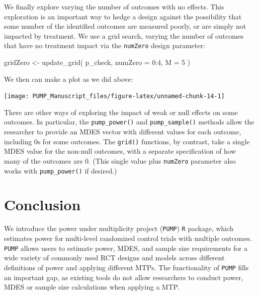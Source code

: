 \documentclass[
]{article}
\newenvironment{Shaded}{\begin{snugshade}}{\end{snugshade}}
\newcommand{\AttributeTok}[1]{\textcolor[rgb]{0.77,0.63,0.00}{#1}}
\newcommand{\DecValTok}[1]{\textcolor[rgb]{0.00,0.00,0.81}{#1}}
\newcommand{\FunctionTok}[1]{\textcolor[rgb]{0.00,0.00,0.00}{#1}}
\newcommand{\NormalTok}[1]{#1}
\newcommand{\OtherTok}[1]{\textcolor[rgb]{0.56,0.35,0.01}{#1}}
\newcommand{\SpecialCharTok}[1]{\textcolor[rgb]{0.00,0.00,0.00}{#1}}
\begin{document}
We finally explore varying the number of outcomes with no effects. This
exploration is an important way to hedge a design against the
possibility that some number of the identified outcomes are measured
poorly, or are simply not impacted by treatment. We use a grid search,
varying the number of outcomes that have no treatment impact via the
\texttt{numZero} design parameter:

\begin{Shaded}
\begin{Highlighting}[]
\NormalTok{gridZero }\OtherTok{\textless{}{-}} \FunctionTok{update\_grid}\NormalTok{( p\_check,}
            \AttributeTok{numZero =} \DecValTok{0}\SpecialCharTok{:}\DecValTok{4}\NormalTok{,}
            \AttributeTok{M =} \DecValTok{5}\NormalTok{ )}
\end{Highlighting}
\end{Shaded}

We then can make a plot as we did above:

\begin{center}\texttt{[image: PUMP\_Manuscript\_files/figure-latex/unnamed-chunk-14-1]} \end{center}

There are other ways of exploring the impact of weak or null effects on
some outcomes. In particular, the \texttt{pump\_power()} and
\texttt{pump\_sample()} methods allow the researcher to provide an MDES
vector with different values for each outcome, including 0s for some
outcomes. The \texttt{grid()} functions, by contrast, take a single MDES
value for the non-null outcomes, with a separate specification of how
many of the outcomes are 0. (This single value plus \texttt{numZero}
parameter also works with \texttt{pump\_power()} if desired.)

\section{Conclusion}
\label{sec:conclusion}

We introduce the power under multiplicity project (\texttt{PUMP})
\texttt{R} package, which estimates power for multi-level randomized
control trials with multiple outcomes. \texttt{PUMP} allows users to
estimate power, MDES, and sample size requirements for a wide variety of
commonly used RCT designs and models across different definitions of
power and applying different MTPs. The functionality of \texttt{PUMP}
fills an important gap, as existing tools do not allow researchers to
conduct power, MDES or sample size calculations when applying a MTP.
\end{document}
